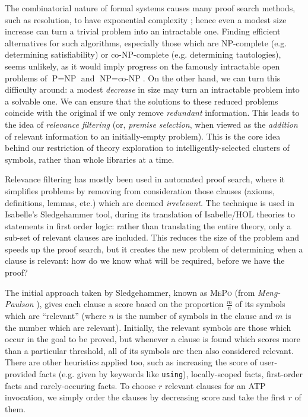 The combinatorial nature of formal systems causes many proof search methods, such as resolution, to have exponential complexity \cite{haken1985intractability}; hence even a modest size increase can turn a trivial problem into an intractable one. Finding efficient alternatives for such algorithms, especially those which are NP-complete (e.g. determining satisfiability) or co-NP-complete (e.g. determining tautologies), seems unlikely, as it would imply progress on the famously intractable open problems of $\text{P} = \text{NP}$ and $\text{NP} = \text{co-NP}$. On the other hand, we can turn this difficulty around: a modest \emph{decrease} in size may turn an intractable problem into a solvable one. We can ensure that the solutions to these reduced problems coincide with the original if we only remove \emph{redundant} information. This leads to the idea of \emph{relevance filtering} (or, \emph{premise selection}, when viewed as the \emph{addition} of relevant information to an initially-empty problem). This is the core idea behind our restriction of theory exploration to intelligently-selected clusters of symbols, rather than whole libraries at a time.

Relevance filtering has mostly been used in automated proof search, where it simplifies problems by removing from consideration those clauses (axioms, definitions, lemmas, etc.) which are deemed \emph{irrelevant}. The technique is used in Isabelle's Sledgehammer tool, during its translation of Isabelle/HOL theories to statements in first order logic: rather than translating the entire theory, only a sub-set of relevant clauses are included. This reduces the size of the problem and speeds up the proof search, but it creates the new problem of determining when a clause is relevant: how do we know what will be required, before we have the proof?

The initial approach taken by Sledgehammer, known as \textsc{MePo} (from \emph{Meng-Paulson} \cite{meng2009lightweight}), gives each clause a score based on the proportion $\frac{m}{n}$ of its symbols which are ``relevant'' (where $n$ is the number of symbols in the clause and $m$ is the number which are relevant). Initially, the relevant symbols are those which occur in the goal to be proved, but whenever a clause is found which scores more than a particular threshold, all of its symbols are then also considered relevant. There are other heuristics applied too, such as increasing the score of user-provided facts (e.g. given by keywords like \texttt{using}), locally-scoped facts, first-order facts and rarely-occuring facts. To choose $r$ relevant clauses for an ATP invocation, we simply order the clauses by decreasing score and take the first $r$ of them.

